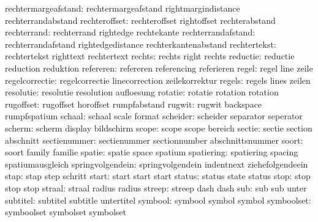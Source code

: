  rechtermargeafstand:  rechtermargeafstand  rightmargindistance  rechterrandabstand
       rechteroffset:  rechteroffset        rightoffset          rechterabstand
         rechterrand:  rechterrand          rightedge            rechtekante
  rechterrandafstand:  rechterrandafstand   rightedgedistance    rechterkantenabstand
        rechtertekst:  rechtertekst         righttext            rechtertext
              rechts:  rechts               right                rechts
            reductie:  reductie             reduction            reduktion
           refereren:  refereren            referencing          referieren
               regel:  regel                line                 zeile
      regelcorrectie:  regelcorrectie       linecorrection       zeilekorrektur
              regels:  regels               lines                zeilen
           resolutie:  resolutie            resolution           aufloesung
             rotatie:  rotatie              rotation             rotation
           rugoffset:  rugoffset            horoffset            rumpfabstand
              rugwit:  rugwit               backspace            rumpfspatium
              schaal:  schaal               scale                format
            scheider:  scheider             separator            seperator
              scherm:  scherm               display              bildschirm
               scope:  scope                scope                bereich
              sectie:  sectie               section              abschnitt
        sectienummer:  sectienummer         sectionnumber        abschnittsnummer
               soort:  soort                family               familie
              spatie:  spatie               space                spatium
          spatiering:  spatiering           spacing              spatiumausgleich
    springvolgendein:  springvolgendein     indentnext           ziehefolgendeein
                stap:  stap                 step                 schritt
               start:  start                start                start
              status:  status               state                status
                stop:  stop                 stop                 stop
              straal:  straal               radius               radius
              streep:  streep               dash                 dash %
                 sub:  sub                  sub                  unter
            subtitel:  subtitel             subtitle             untertitel
             symbool:  symbool              symbol               symbol
          symboolset:  symboolset           symbolset            symbolset 
